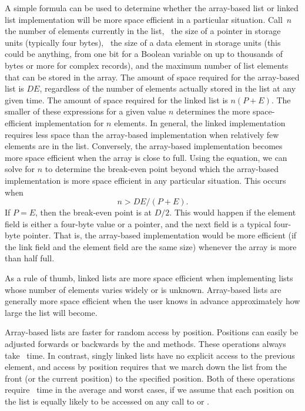 A simple formula can be used to determine whether the array-based list
or linked list implementation will be more space efficient in a
particular situation.
Call~\(n\) the number of elements currently in the list,
~the size of a pointer in storage units
(typically four bytes), ~the size of a data element in storage
units (this could be anything, from one bit for a Boolean variable on
up to thousands of bytes or more for complex records), and  the 
maximum number of list elements that can be stored in the array.
The amount of space required for the array-based list is \(DE\),
regardless of the number of elements actually stored in the list at
any given time.
The amount of space required for the linked list is \(n(P + E)\).
The smaller of these expressions for a given value \(n\) determines the
more space-efficient implementation for \(n\) elements.
In general, the linked implementation requires less space than the
array-based implementation when relatively few elements are in the
list.
Conversely, the array-based implementation becomes more space
efficient when the array is close to full.
Using the equation, we can solve for \(n\) to determine the
break-even point beyond which the array-based implementation is more
space efficient in any particular situation.
This occurs when
\[n > DE/(P + E).\]
\noindent If \(P = E\), then the break-even point is at \(D/2\).
This would happen if the element field is either a four-byte
 value or a pointer, and the next field is a typical
four-byte pointer.
That is, the array-based implementation would be more efficient (if
the link field and the element field are the same size) whenever the
array is more than half full.

As a rule of thumb, linked lists are more space efficient when
implementing lists whose number of elements varies widely or is
unknown.
Array-based lists are generally more space efficient when
the user knows in advance approximately how large the list will
become.

Array-based lists are faster for random access by position.
Positions can easily be adjusted forwards or backwards by
the  and  methods.
These operations always take \Thetaone\ time.
In contrast, singly linked lists have no explicit access to the
previous element, and access by position requires that we march
down the list from the front (or the current position) to the
specified position.
Both of these operations require \Thetan\ time in the average and
worst cases, if we assume that each position on the list is equally
likely to be accessed on any call to  or .

